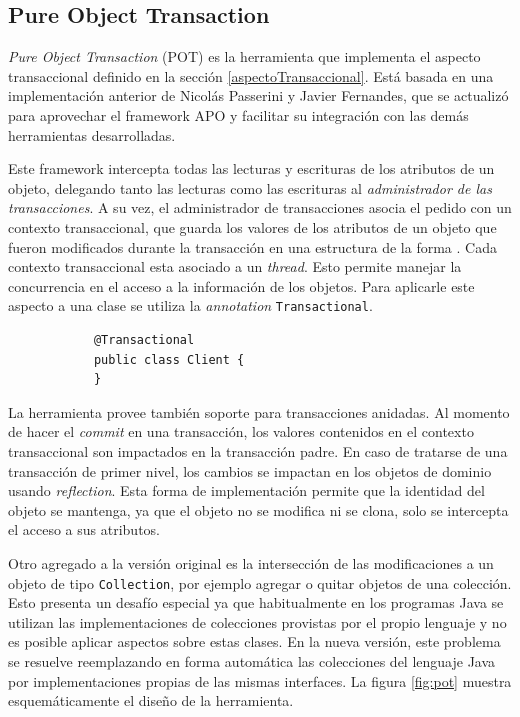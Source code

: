 \subsection{Pure Object Transaction}
	\label{pot} 
	\emph{Pure Object Transaction} (POT) es la herramienta que implementa el
	aspecto transaccional definido en la sección \ref{aspectoTransaccional}.
	Está basada en una implementación anterior de Nicolás Passerini y Javier
	Fernandes, que se actualizó para aprovechar el framework APO y facilitar su
	integración con las demás herramientas desarrolladas.
	
	\medskip
	 
	Este framework intercepta todas las lecturas y escrituras de los atributos de
	un objeto, delegando tanto las lecturas como las escrituras al
	\emph{administrador de las transacciones}.
	A su vez, el administrador de transacciones asocia el pedido con un contexto
	transaccional, que guarda los valores de los atributos de un objeto que fueron
	modificados durante la transacción en una estructura de la forma
	.
	Cada contexto transaccional esta asociado a un \emph{thread}. Esto
	permite manejar la concurrencia en el acceso a la información de los objetos.
	Para aplicarle este aspecto a una clase se utiliza la \emph{annotation}
	\lstinline|Transactional|.
		\begin{lstlisting} 
			@Transactional
			public class Client {
			}
		\end{lstlisting}
	\medskip
	 
	La herramienta provee también soporte para transacciones anidadas.
	Al momento de hacer el \emph{commit} en una transacción, los valores
	contenidos en el contexto transaccional son impactados en la transacción
	padre.
	En caso de tratarse de una transacción de primer nivel, los cambios se impactan
	en los objetos de dominio usando \emph{reflection}.
	Esta forma de implementación permite que la identidad del objeto se
	mantenga, ya que el objeto no se modifica ni se clona, solo se intercepta el
	acceso a sus atributos.
	
	Otro agregado a la versión original es la intersección de las modificaciones 
	a un objeto de tipo \lstinline|Collection|, por ejemplo agregar o quitar
	objetos de una colección.
	Esto presenta un desafío especial ya que habitualmente en los programas Java
	se utilizan las implementaciones de colecciones provistas por el propio
	lenguaje y no es posible aplicar aspectos sobre estas clases. 
	En la nueva versión, este problema se resuelve reemplazando en forma
	automática las colecciones del lenguaje Java por
	implementaciones propias de las mismas interfaces.
	La figura \ref{fig:pot} muestra esquemáticamente el diseño de la herramienta.
	
